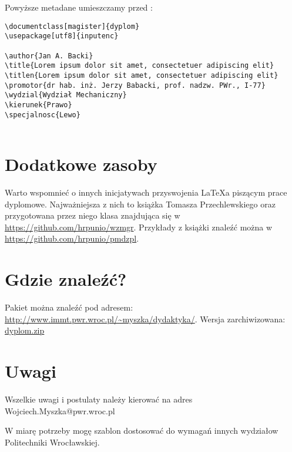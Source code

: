 \begin{enumerate}
\begin{itemize}
\end{itemize}
Powyższe metadane umieszczamy przed \verb||:
\begin{verbatim}
\documentclass[magister]{dyplom}
\usepackage[utf8]{inputenc}

\author{Jan A. Backi}
\title{Lorem ipsum dolor sit amet, consectetuer adipiscing elit}
\titlen{Lorem ipsum dolor sit amet, consectetuer adipiscing elit}
\promotor{dr hab. inż. Jerzy Babacki, prof. nadzw. PWr., I-77}
\wydzial{Wydział Mechaniczny}
\kierunek{Prawo}
\specjalnosc{Lewo}


\end{verbatim}

\end{enumerate}

\section{Dodatkowe zasoby}

Warto wspomnieć  o innych inicjatywach przyswojenia LaTeX{}a piszącym prace dyplomowe. Najważniejsza z nich to książka Tomasza Przechlewskiego \cite{tp-11-latex} oraz przygotowana przez niego klasa znajdująca się w \url{https://github.com/hrpunio/wzmgr}. Przykłady z książki znaleźć można w \url{https://github.com/hrpunio/pmdzpl}.


\section{Gdzie znaleźć?}

Pakiet można znaleźć pod adresem: \url{http://www.immt.pwr.wroc.pl/~myszka/dydaktyka/}. Wersja zarchiwizowana: \href{http://www.immt.pwr.wroc.pl/~myszka/TeX/dyplom/dyplom.zip}{dyplom.zip}

\section{Uwagi}

Wszelkie uwagi i postulaty należy kierować na adres Wojciech.Myszka@pwr.wroc.pl

W miarę potrzeby mogę szablon dostosować do wymagań innych wydziałow Politechniki Wrocławskiej.
